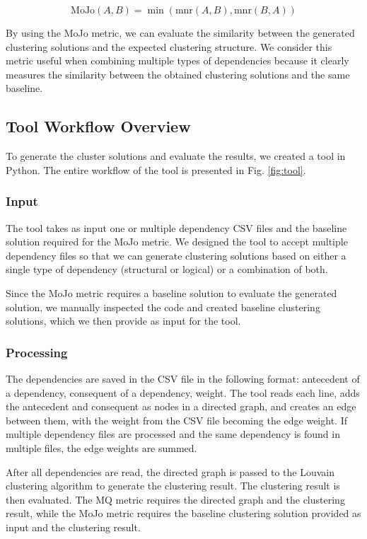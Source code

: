 \documentclass{ieeeaccess}
\begin{document}
\begin{equation}
\text{MoJo}(A, B) = \min(\text{mnr}(A, B), \text{mnr}(B, A))
\label{eq:mojo}
\end{equation}

By using the MoJo metric, we can evaluate the similarity between the generated clustering solutions and the expected clustering structure. We consider this metric useful when combining multiple types of dependencies because it clearly measures the similarity between the obtained clustering solutions and the same baseline.

\subsection{Tool Workflow Overview}
\label{subsec:tool_workflow}

To generate the cluster solutions and evaluate the results, we created a tool in Python. The entire workflow of the tool is presented in Fig. \ref{fig:tool}.

\subsubsection{Input}

The tool takes as input one or multiple dependency CSV files and the baseline solution required for the MoJo metric. We designed the tool to accept multiple dependency files so that we can generate clustering solutions based on either a single type of dependency (structural or logical) or a combination of both.

Since the MoJo metric requires a baseline solution to evaluate the generated solution, we manually inspected the code and created baseline clustering solutions, which we then provide as input for the tool.

\subsubsection{Processing}

The dependencies are saved in the CSV file in the following format: antecedent of a dependency, consequent of a dependency, weight. The tool reads each line, adds the antecedent and consequent as nodes in a directed graph, and creates an edge between them, with the weight from the CSV file becoming the edge weight. If multiple dependency files are processed and the same dependency is found in multiple files, the edge weights are summed.


After all dependencies are read, the directed graph is passed to the Louvain clustering algorithm to generate the clustering result. The clustering result is then evaluated. The MQ metric requires the directed graph and the clustering result, while the MoJo metric requires the baseline clustering solution provided as input and the clustering result.
\end{document}
